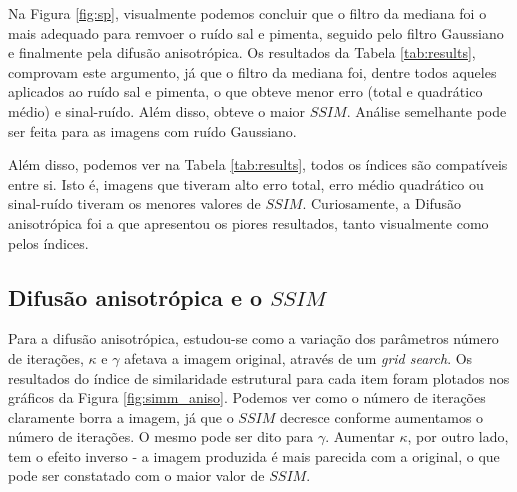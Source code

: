 \documentclass[10pt,a4paper]{article}
\begin{document}
Na Figura \ref{fig:sp}, visualmente podemos concluir que o filtro da mediana foi o mais adequado para remvoer o ruído sal e pimenta, seguido pelo filtro Gaussiano e finalmente pela difusão anisotrópica. Os resultados da Tabela \ref{tab:results}, comprovam este argumento, já que o filtro da mediana foi, dentre todos aqueles aplicados ao ruído sal e pimenta, o que obteve menor erro (total e quadrático médio) e sinal-ruído. Além disso, obteve o maior $\mathit{SSIM}$. Análise semelhante pode ser feita para as imagens com ruído Gaussiano.

Além disso, podemos ver na Tabela \ref{tab:results}, todos os índices são compatíveis entre si. Isto é, imagens que tiveram alto erro total, erro médio quadrático ou sinal-ruído tiveram os menores valores de $\mathit{SSIM}$. Curiosamente, a Difusão anisotrópica foi a que apresentou os piores resultados, tanto visualmente como pelos índices.

\subsection{Difusão anisotrópica e o $\mathit{SSIM}$}
Para a difusão anisotrópica, estudou-se como a variação dos parâmetros número de iterações, $\kappa$ e $\gamma$ afetava a imagem original, através de um \textit{grid search}. Os resultados do índice de similaridade estrutural para cada item foram plotados nos gráficos da Figura \ref{fig:simm_aniso}. Podemos ver como o número de iterações claramente borra a imagem, já que o $\mathit{SSIM}$ decresce conforme aumentamos o número de iterações. O mesmo pode ser dito para $\gamma$. Aumentar $\kappa$, por outro lado, tem o efeito inverso - a imagem produzida é mais parecida com a original, o que pode ser constatado com o maior valor de $\mathit{SSIM}$.
\end{document}
